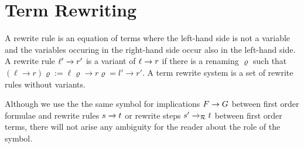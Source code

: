 

\section{Term Rewriting}\label{sec:termrewriting}




\begin{definition}\label{def:rewriterule}
	A {\myem rewrite rule} is an equation of terms where the left-hand side is not a variable
	and the variables occuring in the right-hand side occur also in the left-hand side.
	A rewrite rule $\ell'\xrightarrow[{}]{} r'$ is a {\myem variant} of $\ell\xrightarrow[{}]{} r$ if there is a renaming $\varrho$
	such that 
	$(\ell\rightarrow r)\varrho := \ell\varrho\rightarrow r\varrho = l'\rightarrow r'$.
	A {\myem term rewrite system} is a set of rewrite rules without variants.
\end{definition}

Although we use the the same symbol for implications $F\rightarrow G$ between first order formulae 
and rewrite rules $s\xrightarrow[{}]{} t$ or rewrite steps $s'\xrightarrow[{}]{}_{\mathcal R} t$ between first order terms,
there will not arise any ambiguity for the reader about the role of the symbol.

